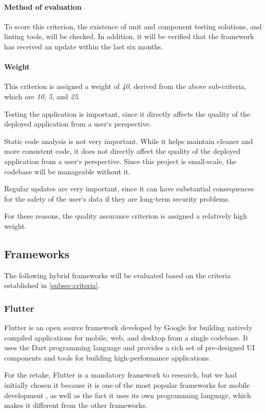 \paragraph{Method of evaluation}
To score this criterion, the existence of unit and component testing solutions, and linting tools, will be checked.
In addition, it will be verified that the framework has received an update within the last six months.

\paragraph{Weight}
This criterion is assigned a weight of \emph{40}, derived from the above sub-criteria, which are \emph{10}, \emph{5}, and \emph{25}.

Testing the application is important, since it directly affects the quality of the deployed application from a user`s perspective.

Static code analysis is not very important.
While it helps maintain cleaner and more consistent code, it does not directly affect the quality of the deployed application from a user`s perspective.
Since this project is small-scale, the codebase will be manageable without it.

Regular updates are very important, since it can have substantial consequences for the safety of the user`s data if they are long-term security problems.

For these reasons, the quality assurance criterion is assigned a relatively high weight.

\subsection{Frameworks}\label{subsec:frameworks}
The following hybrid frameworks will be evaluated based on the criteria established in \cref{subsec:criteria}.

\subsubsection{Flutter}\label{subsubsec:frameworks-flutter}
Flutter is an open source framework developed by Google for building natively compiled applications for mobile, web, and desktop from a single codebase. \cite{bib:most-popular-mobile-frameworks-2024}
It uses the Dart programming language and provides a rich set of pre-designed UI components and tools for building high-performance applications.

For the retake, Flutter is a mandatory framework to research, but we had initially chosen it because it is one of the most popular frameworks for mobile development \cite{bib:most-popular-mobile-frameworks-2024}, as well as the fact it uses its own programming language, which makes it different from the other frameworks.

